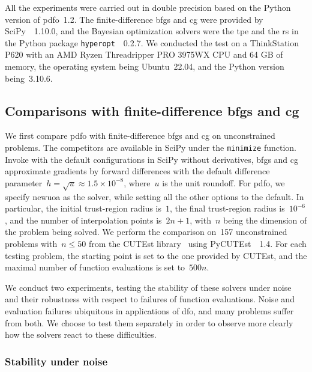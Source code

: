 \documentclass[
    smallextended,  %
    final,        %
]{svjour3}
\begin{document}
All the experiments were carried out in double precision based on the Python version of \gls{pdfo}~1.2.
The finite-difference \gls{bfgs} and \gls{cg} were provided by SciPy~\cite{Virtanen_Etal_2020}~1.10.0,
and the Bayesian optimization solvers were the \gls{tpe} and the \gls{rs} in the Python package
\texttt{hyperopt}~\cite{Bergstra_Yamins_Cox_2013}~0.2.7.
We conducted the test on a ThinkStation P620 with an AMD Ryzen Threadripper
PRO 3975WX CPU and 64 GB of memory, the operating system being Ubuntu~22.04, and the Python version
being~3.10.6.


\subsection{Comparisons with finite-difference \gls{bfgs} and \gls{cg}}
\label{ssec:fd}

We first compare \gls{pdfo} with finite-difference \gls{bfgs} and \gls{cg} on unconstrained
problems. The competitors are available in SciPy under the \texttt{minimize} function.
Invoke with the default configurations in SciPy without derivatives,
\gls{bfgs} and \gls{cg} approximate gradients by forward differences with the default difference
parameter~$h = \sqrt{u} \approx 1.5\times 10^{-8}$, where~$u$ is the unit roundoff.
For \gls{pdfo}, we specify \gls{newuoa} as the solver, while setting all the other options to the default.
In particular, the initial trust-region radius is~$1$, the final trust-region radius is~$10^{-6}$,
and the number of interpolation points is~$2n + 1$, with~$n$ being the dimension of the problem
being solved.
We perform the comparison on~157 unconstrained problems with~$n \le 50$ from the CUTEst
library~\cite{Gould_Orban_Toint_2015} using PyCUTEst~\cite{Fowkes_Roberts_Burmen_2022}~1.4.
For each testing problem, the starting point is set to the one provided by CUTEst, and the maximal
number of function evaluations is set to~$500n$.


We conduct two experiments, testing the stability of these solvers under noise and their robustness
with respect to failures of function evaluations. Noise and evaluation failures ubiquitous in
applications of \gls{dfo}, and many problems suffer from both. We choose to test them separately in
order to observe more clearly how the solvers react to these difficulties.

\subsubsection{Stability under noise}
\end{document}
